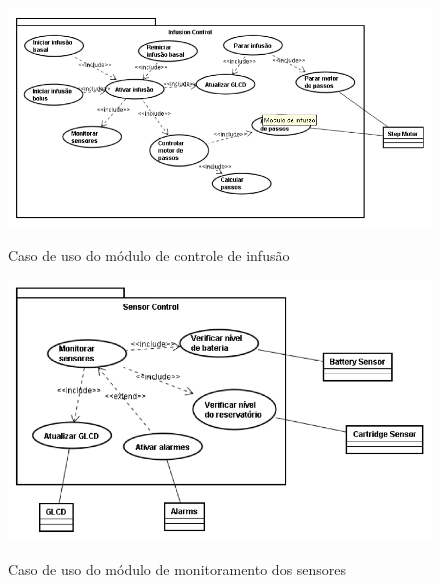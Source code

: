 \begin{figure}[htp]
	\centering
	\includegraphics[scale=1]{images/modulo_infusao.png}
	\caption{Caso de uso do módulo de controle de infusão}	
	\label{fig:usecasemoduloinfusao}
	\cite{galvao2013requirements}
\end{figure}

\begin{figure}[htp]
	\centering
	\includegraphics[scale=1]{images/modulo_sensores.png}
	\caption{Caso de uso do módulo de monitoramento dos sensores}	
	\label{fig:usecasemodulosensores}
	\cite{galvao2013requirements}
\end{figure}


